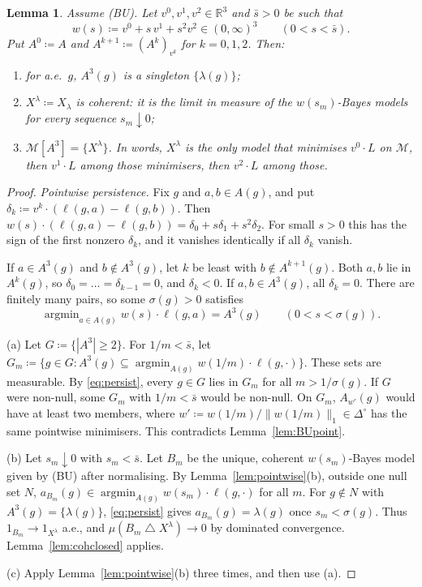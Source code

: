 \documentclass[11pt]{article}
\newtheorem{lemma}[theorem]{Lemma}
\theoremstyle{remark}
\newcommand{\R}{\mathbb R}
\newcommand{\Di}{\Delta^{\circ}}
\newcommand{\M}{\mathcal M}
\newcommand{\sd}{\mathbin{\triangle}}
\DeclareMathOperator*{\argmin}{argmin}
\begin{document}
\begin{lemma}\label{lem:lex}
Assume \textup{(BU)}. Let $v^0,v^1,v^2\in\R^3$ and $\bar s>0$ be such that
\[
w(s)\coloneqq v^0+s\,v^1+s^2v^2\in(0,\infty)^3\qquad(0<s<\bar s).
\]
Put $A^0\coloneqq A$ and $A^{k+1}\coloneqq(A^k)_{v^k}$ for $k=0,1,2$. Then:
\begin{enumerate}[leftmargin=*,label=\textup{(\alph*)}]
\item for a.e.\ $g$, $A^3(g)$ is a singleton $\{\lambda(g)\}$;
\item $X^\lambda\coloneqq X_\lambda$ is coherent: it is the limit in measure of the $w(s_m)$-Bayes models for every sequence $s_m\downarrow0$;
\item $\M[A^3]=\{X^\lambda\}$. In words, $X^\lambda$ is the only model that minimises $v^0\cdot L$ on $\M$, then $v^1\cdot L$ among those minimisers, then $v^2\cdot L$ among those.
\end{enumerate}
\end{lemma}

\begin{proof}
\emph{Pointwise persistence.} Fix $g$ and $a,b\in A(g)$, and put $\delta_k\coloneqq v^k\cdot(\ell(g,a)-\ell(g,b))$. Then $w(s)\cdot(\ell(g,a)-\ell(g,b))=\delta_0+s\delta_1+s^2\delta_2$. For small $s>0$ this has the sign of the first nonzero $\delta_k$, and it vanishes identically if all $\delta_k$ vanish.

If $a\in A^3(g)$ and $b\notin A^3(g)$, let $k$ be least with $b\notin A^{k+1}(g)$. Both $a,b$ lie in $A^k(g)$, so $\delta_0=\dots=\delta_{k-1}=0$, and $\delta_k<0$. If $a,b\in A^3(g)$, all $\delta_k=0$. There are finitely many pairs, so some $\sigma(g)>0$ satisfies
\begin{equation}\label{eq:persist}
\argmin_{a\in A(g)}w(s)\cdot\ell(g,a)=A^3(g)\qquad(0<s<\sigma(g)).
\end{equation}

(a) Let $G\coloneqq\{|A^3|\ge2\}$. For $1/m<\bar s$, let $G_m\coloneqq\{g\in G:A^3(g)\subseteq\argmin_{A(g)}w(1/m)\cdot\ell(g,\cdot)\}$. These sets are measurable. By \eqref{eq:persist}, every $g\in G$ lies in $G_m$ for all $m>1/\sigma(g)$. If $G$ were non-null, some $G_m$ with $1/m<\bar s$ would be non-null. On $G_m$, $A_{w'}(g)$ would have at least two members, where $w'\coloneqq w(1/m)/\|w(1/m)\|_1\in\Di$ has the same pointwise minimisers. This contradicts Lemma~\ref{lem:BUpoint}.

(b) Let $s_m\downarrow0$ with $s_m<\bar s$. Let $B_m$ be the unique, coherent $w(s_m)$-Bayes model given by (BU) after normalising. By Lemma~\ref{lem:pointwise}(b), outside one null set $N$, $a_{B_m}(g)\in\argmin_{A(g)}w(s_m)\cdot\ell(g,\cdot)$ for all $m$. For $g\notin N$ with $A^3(g)=\{\lambda(g)\}$, \eqref{eq:persist} gives $a_{B_m}(g)=\lambda(g)$ once $s_m<\sigma(g)$. Thus $1_{B_m}\to1_{X^\lambda}$ a.e., and $\mu(B_m\sd X^\lambda)\to0$ by dominated convergence. Lemma~\ref{lem:cohclosed} applies.

(c) Apply Lemma~\ref{lem:pointwise}(b) three times, and then use (a).
\end{proof}
\end{document}
